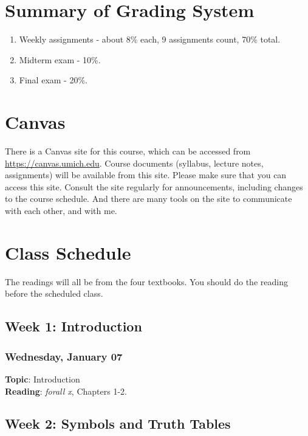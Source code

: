 \documentclass[
  letterpaper,
  DIV=11,
  numbers=noendperiod]{scrartcl}
\providecommand{\tightlist}{%
  \setlength{\itemsep}{0pt}\setlength{\parskip}{0pt}}
\begin{document}
\section{Summary of Grading System}\label{summary-of-grading-system}

\begin{enumerate}
\def\labelenumi{\arabic{enumi}.}
\tightlist
\item
  Weekly assignments - about 8\% each, 9 assignments count, 70\% total.
\item
  Midterm exam - 10\%.
\item
  Final exam - 20\%.
\end{enumerate}

\section{Canvas}\label{canvas}

There is a Canvas site for this course, which can be accessed from
\url{https://canvas.umich.edu}. Course documents (syllabus, lecture
notes, assignments) will be available from this site. Please make sure
that you can access this site. Consult the site regularly for
announcements, including changes to the course schedule. And there are
many tools on the site to communicate with each other, and with me.

\pagebreak

\section{Class Schedule}\label{class-schedule}

The readings will all be from the four textbooks. You should do the
reading before the scheduled class.

\subsection{Week 1: Introduction}\label{week-1-introduction}

\subsubsection{Wednesday, January 07}\label{wednesday-january-07}

\textbf{Topic}: Introduction\\
\textbf{Reading}: \emph{forall x}, Chapters 1-2.

\subsection{Week 2: Symbols and Truth
Tables}\label{week-2-symbols-and-truth-tables}
\end{document}
